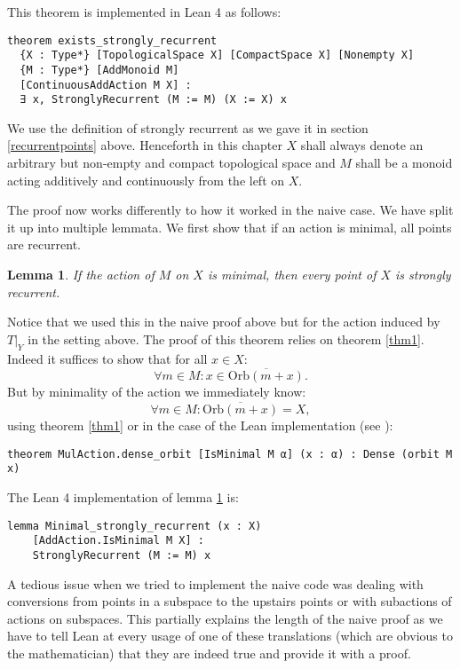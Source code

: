 \documentclass[11pt]{article}
\newtheorem{lemma}{Lemma}[section]
\theoremstyle{definition}              %
\theoremstyle{definition}              %
\theoremstyle{definition}              %
\begin{document}
This theorem is implemented in Lean 4 as follows:

\begin{lstlisting}
theorem exists_strongly_recurrent
  {X : Type*} [TopologicalSpace X] [CompactSpace X] [Nonempty X]
  {M : Type*} [AddMonoid M]
  [ContinuousAddAction M X] :
  ∃ x, StronglyRecurrent (M := M) (X := X) x
\end{lstlisting}

We use the definition of strongly recurrent as we gave it in section \ref{recurrentpoints} above. Henceforth in this chapter $X$ shall always denote an arbitrary but non-empty and compact topological space and $M$ shall be a monoid acting additively and continuously from the left on $X$.

The proof now works differently to how it worked in the naive case. We have split it up into multiple lemmata. We first show that if an action is minimal, all points are recurrent.

\begin{lemma}\label{lem1}
    If the action of $M$ on $X$ is minimal, then every point of $X$ is strongly recurrent.
\end{lemma}

Notice that we used this in the naive proof above but for the action induced by $T|_Y$ in the setting above. The proof of this theorem relies on theorem \ref{thm1}. Indeed it suffices to show that for all $x \in X$:
\begin{equation}
    \forall m \in M: x \in \overline{\text{Orb}(m+x)}.
\end{equation}
But by minimality of the action we immediately know:
\begin{equation}
    \forall m \in M:\overline{\text{Orb}(m+x)}=X,
\end{equation}
using theorem \ref{thm1} or in the case of the Lean implementation (see \cite{kudry}):

\begin{lstlisting}
theorem MulAction.dense_orbit [IsMinimal M α] (x : α) : Dense (orbit M x)
\end{lstlisting}

The Lean 4 implementation of lemma \ref{lem1} is:

\begin{lstlisting}
lemma Minimal_strongly_recurrent (x : X)
    [AddAction.IsMinimal M X] :
    StronglyRecurrent (M := M) x
\end{lstlisting}

A tedious issue when we tried to implement the naive code was dealing with conversions from points in a subspace to the upstairs points or with subactions of actions on subspaces. This partially explains the length of the naive proof as we have to tell Lean at every usage of one of these translations (which are obvious to the mathematician) that they are indeed true and provide it with a proof.
\end{document}
